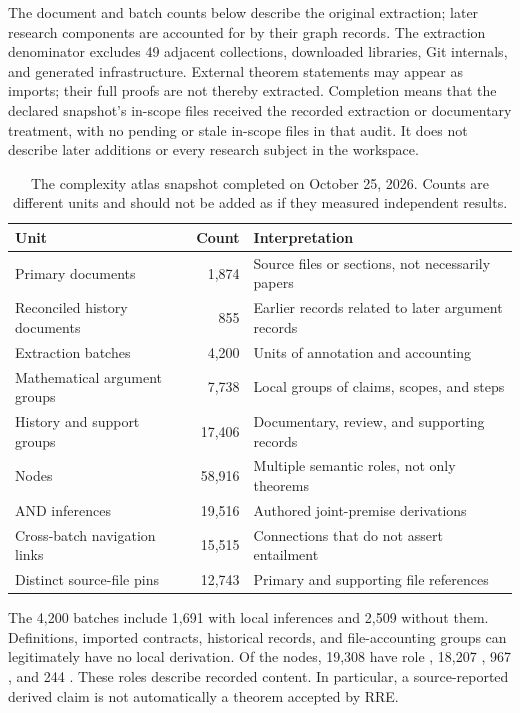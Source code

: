 The document and batch counts below describe the original extraction; later research components are accounted for by their graph records. The extraction denominator excludes 49 adjacent collections, downloaded libraries, Git internals, and generated infrastructure. External theorem statements may appear as imports; their full proofs are not thereby extracted. Completion means that the declared snapshot's in-scope files received the recorded extraction or documentary treatment, with no pending or stale in-scope files in that audit. It does not describe later additions or every research subject in the workspace.

\begin{table}[htbp]
\centering\small
\begin{tabularx}{\linewidth}{@{}Yrp{5.8cm}@{}}
\toprule
Unit & Count & Interpretation \\
\midrule
Primary documents & 1,874 & Source files or sections, not necessarily papers \\
Reconciled history documents & 855 & Earlier records related to later argument records \\
Extraction batches & 4,200 & Units of annotation and accounting \\
Mathematical argument groups & 7,738 & Local groups of claims, scopes, and steps \\
History and support groups & 17,406 & Documentary, review, and supporting records \\
Nodes & 58,916 & Multiple semantic roles, not only theorems \\
AND inferences & 19,516 & Authored joint-premise derivations \\
Cross-batch navigation links & 15,515 & Connections that do not assert entailment \\
Distinct source-file pins & 12,743 & Primary and supporting file references \\
\bottomrule
\end{tabularx}
\caption{The complexity atlas snapshot completed on October 25, 2026. Counts are different units and should not be added as if they measured independent results.}
\label{tab:atlas-counts}
\end{table}

The 4,200 batches include 1,691 with local inferences and 2,509 without them. Definitions, imported contracts, historical records, and file-accounting groups can legitimately have no local derivation. Of the nodes, 19,308 have role , 18,207 , 967 , and 244 . These roles describe recorded content. In particular, a source-reported derived claim is not automatically a theorem accepted by RRE.

